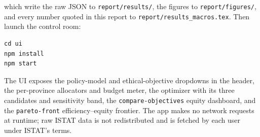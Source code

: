 \documentclass[11pt,a4paper]{article}
\newcommand{\code}[1]{\texttt{#1}}
\begin{document}
which write the raw JSON to \code{report/results/}, the figures to
\code{report/figures/}, and every number quoted in this report to
\code{report/results\_macros.tex}. Then launch the control room:

\begin{verbatim}
cd ui
npm install
npm start
\end{verbatim}

The UI exposes the policy-model and ethical-objective dropdowns in the header,
the per-province allocators and budget meter, the optimizer with its three
candidates and sensitivity band, the \code{compare-objectives} equity
dashboard, and the \code{pareto-front} efficiency--equity frontier. The app
makes no network requests at runtime; raw ISTAT data is not redistributed and
is fetched by each user under ISTAT's terms.
\end{document}
